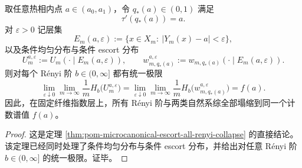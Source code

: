 \begin{theorem}\label{thm:conclusion-oracle-hotlayer-all-renyi-collapse}
取任意热相内点 \(a\in(a_0,a_1)\)，令 \(q_\ast(a)\in(0,1)\) 满足
\[
\tau'(q_\ast(a))=a.
\]
对 \(\varepsilon>0\) 记层集
\[
E_m(a,\varepsilon):=\{x\in X_m:\ |Y_m(x)-a|<\varepsilon\},
\]
以及条件均匀分布与条件 escort 分布
\[
U_m^{a,\varepsilon}:=U_m(\cdot\mid E_m(a,\varepsilon)),
\qquad
w_{m,q_\ast(a)}^{a,\varepsilon}:=w_{m,q_\ast(a)}(\cdot\mid E_m(a,\varepsilon)).
\]
则对每个 Rényi 阶 \(b\in(0,\infty]\) 都有统一极限
\[
\lim_{\varepsilon\downarrow0}\lim_{m\to\infty}\frac1m H_b\!\bigl(U_m^{a,\varepsilon}\bigr)
=
\lim_{\varepsilon\downarrow0}\lim_{m\to\infty}\frac1m H_b\!\bigl(w_{m,q_\ast(a)}^{a,\varepsilon}\bigr)
=
f(a).
\]
因此，在固定纤维指数层上，所有 Rényi 阶与两类自然系综全部塌缩到同一个计数谱值 \(f(a)\)。
\end{theorem}
\begin{proof}
这是定理 \ref{thm:pom-microcanonical-escort-all-renyi-collapse} 的直接结论。该定理已经同时处理了条件均匀分布与条件 escort 分布，并给出对任意 Rényi 阶 \(b\in(0,\infty]\) 的统一极限。证毕。
\end{proof}

